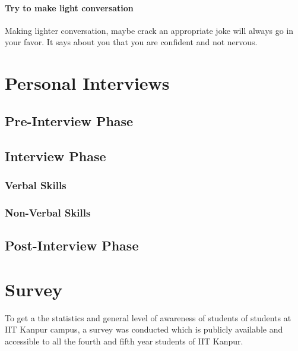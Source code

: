 \documentclass[a4paper,12pt]{report}
\begin{document}
\subsubsection{Try to make light conversation}
Making lighter conversation, maybe crack an appropriate joke will always go in your favor. It says about you
that you are confident and not nervous.
\chapter{Personal Interviews}
\section{Pre-Interview Phase}
\section{Interview Phase}
\subsection{Verbal Skills}
\subsection{Non-Verbal Skills}
\section{Post-Interview Phase}
\chapter{Survey}
To get a the statistics and general level of awareness of students of students at IIT Kanpur campus, a
survey was conducted which is publicly available and accessible to all the fourth and fifth year 
students of IIT Kanpur.
\end{document}
